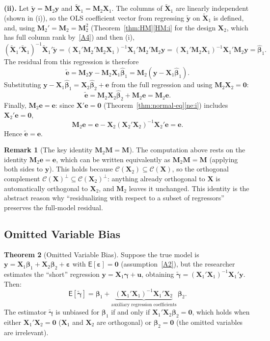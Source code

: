 \documentclass[12pt,a4paper]{article}
\makeatletter
\theoremstyle{definition}
\newtheorem{theorem}{Theorem}[section]
\newtheorem{remark}[theorem]{Remark}
\renewenvironment{proof}[1][\proofname]{\par
  \pushQED{\qed}%
  \normalfont \topsep6\p@\@plus6\p@\relax
  \trivlist
  \item[\hskip\labelsep\bfseries #1\@addpunct{.}]\ignorespaces
}{%
  \popQED\endtrivlist\@endpefalse
}
\newcommand\expc{\mathsf{E}}
\newcommand{\bX}{\mathbf{X}}
\newcommand{\by}{\mathbf{y}}
\def\bb{\boldsymbol{\beta}}
\newcommand{\be}{\boldsymbol{\varepsilon}}
\newcommand{\bM}{\mathbf{M}}
\newcommand{\bzero}{\mathbf{0}}
\newcommand{\calC}{\mathcal{C}}
\makeatother
\begin{document}
\begin{proof}
\textbf{(ii).} Let $\tilde{\by} = \bM_2\by$ and $\tilde{\bX}_1 = \bM_2\bX_1$. The columns of $\tilde{\bX}_1$ are linearly independent (shown in (i)), so the OLS coefficient vector from regressing $\tilde{\by}$ on $\tilde{\bX}_1$ is defined, and, using $\bM_2' = \bM_2 = \bM_2^2$ (Theorem~\ref{thm:HM}\ref{HM:i} for the design $\bX_2$, which has full column rank by~\ref{A4}) and then (i),
\[
(\tilde{\bX}_1'\tilde{\bX}_1)^{-1}\tilde{\bX}_1'\tilde{\by} = (\bX_1'\bM_2'\bM_2\bX_1)^{-1}\bX_1'\bM_2'\bM_2\by = (\bX_1'\bM_2\bX_1)^{-1}\bX_1'\bM_2\by = \hat{\bb}_1.
\]
The residual from this regression is therefore
\[
\tilde{\mathbf{e}} = \bM_2\by - \bM_2\bX_1\hat{\bb}_1 = \bM_2(\by - \bX_1\hat{\bb}_1).
\]
Substituting $\by - \bX_1\hat{\bb}_1 = \bX_2\hat{\bb}_2 + \mathbf{e}$ from the full regression and using $\bM_2\bX_2 = \bzero$:
\begin{equation}
\tilde{\mathbf{e}} = \bM_2\bX_2\hat{\bb}_2 + \bM_2\mathbf{e} = \bM_2\mathbf{e}.
\end{equation}
Finally, $\bM_2\mathbf{e} = \mathbf{e}$: since $\bX'\mathbf{e} = \bzero$ (Theorem~\ref{thm:normal-eq}\ref{ne:i}) includes $\bX_2'\mathbf{e} = \bzero$,
\[
\bM_2\mathbf{e} = \mathbf{e} - \bX_2(\bX_2'\bX_2)^{-1}\bX_2'\mathbf{e} = \mathbf{e}.
\]
Hence $\tilde{\mathbf{e}} = \mathbf{e}$.
\end{proof}

\begin{remark}[The key identity $\bM_2\bM = \bM$]\label{rem:M2M}
The computation above rests on the identity $\bM_2\mathbf{e} = \mathbf{e}$, which can be written equivalently as $\bM_2\bM = \bM$ (applying both sides to $\by$). This holds because $\calC(\bX_2) \subseteq \calC(\bX)$, so the orthogonal complement $\calC(\bX)^\perp \subseteq \calC(\bX_2)^\perp$: anything already orthogonal to $\bX$ is automatically orthogonal to $\bX_2$, and $\bM_2$ leaves it unchanged. This identity is the abstract reason why ``residualizing with respect to a subset of regressors'' preserves the full-model residual.
\end{remark}

\subsection{Omitted Variable Bias}

\begin{theorem}[Omitted Variable Bias]\label{thm:ovb}
Suppose the true model is $\by = \bX_1\bb_1 + \bX_2\bb_2 + \be$ with $\expc[\be] = \bzero$ (assumption~\ref{A2}), but the researcher estimates the ``short'' regression $\by = \bX_1\boldsymbol\gamma + \mathbf{u}$, obtaining $\tilde{\boldsymbol\gamma} = (\bX_1'\bX_1)^{-1}\bX_1'\by$. Then:
\begin{equation}\label{eq:ovb}
\expc[\tilde{\boldsymbol\gamma}] = \bb_1 + \underbrace{(\bX_1'\bX_1)^{-1}\bX_1'\bX_2}_{\text{auxiliary regression coefficients}}\,\bb_2.
\end{equation}
The estimator $\tilde{\boldsymbol\gamma}$ is unbiased for $\bb_1$ if and only if $\bX_1'\bX_2\bb_2 = \bzero$, which holds when either $\bX_1'\bX_2 = \bzero$ ($\bX_1$ and $\bX_2$ are orthogonal) or $\bb_2 = \bzero$ (the omitted variables are irrelevant).
\end{theorem}
\end{document}
